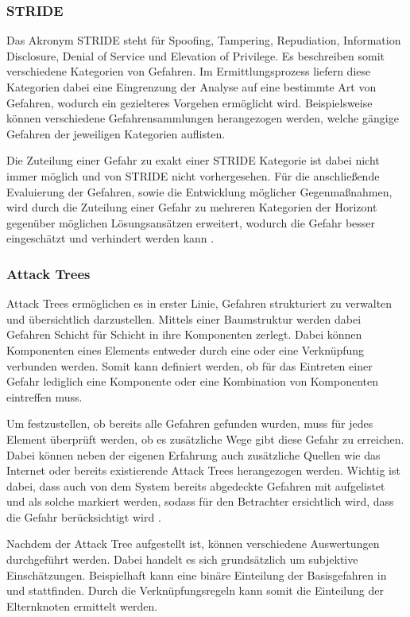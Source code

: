 \subsubsection{STRIDE}\label{sec:stride}
Das Akronym STRIDE steht für Spoofing, Tampering, Repudiation, Information Disclosure, Denial of Service und Elevation of Privilege.
Es beschreiben somit verschiedene Kategorien von Gefahren.
Im Ermittlungsprozess liefern diese Kategorien dabei eine Eingrenzung der Analyse auf eine bestimmte Art von Gefahren, wodurch ein gezielteres Vorgehen ermöglicht wird.
Beispielsweise können verschiedene Gefahrensammlungen herangezogen werden, welche gängige Gefahren der jeweiligen Kategorien auflisten.

Die Zuteilung einer Gefahr zu exakt einer STRIDE Kategorie ist dabei nicht immer möglich und von STRIDE nicht vorhergesehen.
Für die anschließende Evaluierung der Gefahren, sowie die Entwicklung möglicher Gegenmaßnahmen, wird durch die Zuteilung einer Gefahr zu mehreren Kategorien der Horizont gegenüber möglichen Lösungsansätzen erweitert, wodurch die Gefahr besser eingeschätzt und verhindert werden kann \autocite[vgl.][S. 61-64]{shostack_threat_2014}.

\subsubsection{Attack Trees}
Attack Trees ermöglichen es in erster Linie, Gefahren strukturiert zu verwalten und übersichtlich darzustellen.
Mittels einer Baumstruktur werden dabei Gefahren Schicht für Schicht in ihre Komponenten zerlegt.
Dabei können Komponenten eines Elements entweder durch eine  oder eine  Verknüpfung verbunden werden.
Somit kann definiert werden, ob für das Eintreten einer Gefahr lediglich eine Komponente oder eine Kombination von Komponenten eintreffen muss.

Um festzustellen, ob bereits alle Gefahren gefunden wurden, muss für jedes Element überprüft werden, ob es zusätzliche Wege gibt diese Gefahr zu erreichen.
Dabei können neben der eigenen Erfahrung auch zusätzliche Quellen wie das Internet oder bereits existierende Attack Trees herangezogen werden.
Wichtig ist dabei, dass auch von dem System bereits abgedeckte Gefahren mit aufgelistet und als solche markiert werden, sodass für den Betrachter ersichtlich wird, dass die Gefahr berücksichtigt wird \autocite[vgl.][S. 88-94]{shostack_threat_2014}.

Nachdem der Attack Tree aufgestellt ist, können verschiedene Auswertungen durchgeführt werden.
Dabei handelt es sich grundsätzlich um subjektive Einschätzungen.
Beispielhaft kann eine binäre Einteilung der Basisgefahren in  und  stattfinden.
Durch die Verknüpfungsregeln kann somit die Einteilung der Elternknoten ermittelt werden.

